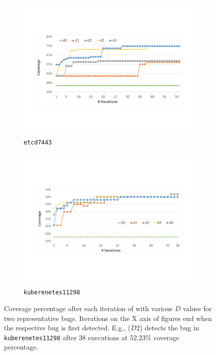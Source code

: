 \begin{figure}
     \centering
     \begin{subfigure}[b]{0.46\textwidth}
        \centering
        \includegraphics[width=\textwidth]{figs/coverage_etcd7443.pdf}
        \caption{\texttt{etcd7443}}
        \label{fig:etcd_coverage}
     \end{subfigure}
     \hfill
     \begin{subfigure}[b]{0.46\textwidth}
       \centering
       \includegraphics[width=\textwidth]{figs/coverage_kubernetes11298.pdf}
       \caption{\texttt{kuberenetes11298}}
       \label{fig:kubernetes_coverage}
     \end{subfigure}
        \caption{Coverage percentage after each iteration of \goat with various $D$ values for two representative bugs. Iterations on the X axis of figures end when the respective bug is first detected. E.g., \goat($D2$) detects the bug in \texttt{kuberenetes11298} after 38 executions at 52.23\% coverage percentage.}
        \label{fig:coverage}
\end{figure}



